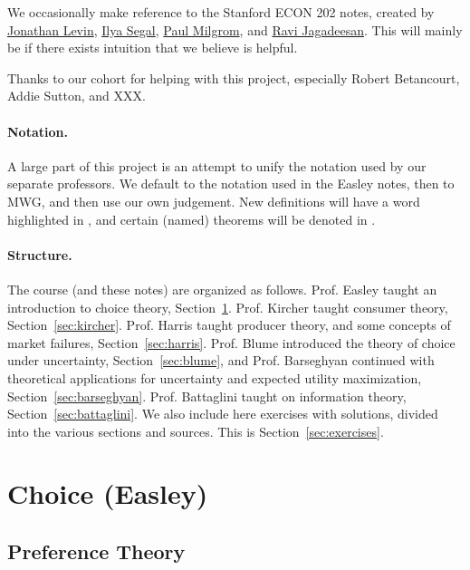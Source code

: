 \documentclass[12pt]{article}
\begin{document}
We occasionally make reference to the Stanford ECON 202 notes, created by \href{https://www.gsb.stanford.edu/faculty-research/faculty/jonathan-levin}{Jonathan Levin}, \href{https://web.stanford.edu/~isegal/}{Ilya Segal}, \href{https://milgrom.people.stanford.edu/}{Paul Milgrom}, and \href{https://sites.google.com/site/ravijagadeesan/}{Ravi Jagadeesan}. This will mainly be if there exists intuition that we believe is helpful.

Thanks to our cohort for helping with this project, especially Robert Betancourt, Addie Sutton, and XXX.

\paragraph{Notation.} A large part of this project is an attempt to unify the notation used by our separate professors. We default to the notation used in the Easley notes, then to MWG, and then use our own judgement. New definitions will have a word highlighted in , and certain (named) theorems will be denoted in . 

\paragraph{Structure.} The course (and these notes) are organized as follows. Prof. Easley taught an introduction to choice theory, Section~\ref{sec:easley}. Prof. Kircher taught consumer theory, Section~\ref{sec:kircher}. Prof. Harris taught producer theory, and some concepts of market failures, Section~\ref{sec:harris}. Prof. Blume introduced the theory of choice under uncertainty, Section~\ref{sec:blume}, and Prof. Barseghyan continued with theoretical applications for uncertainty and expected utility maximization, Section~\ref{sec:barseghyan}. Prof. Battaglini taught on information theory, Section~\ref{sec:battaglini}. We also include here exercises with solutions, divided into the various sections and sources. This is Section~\ref{sec:exercises}.




\newpage
\section{Choice (Easley)}\label{sec:easley}

\subsection{Preference Theory}
\end{document}
